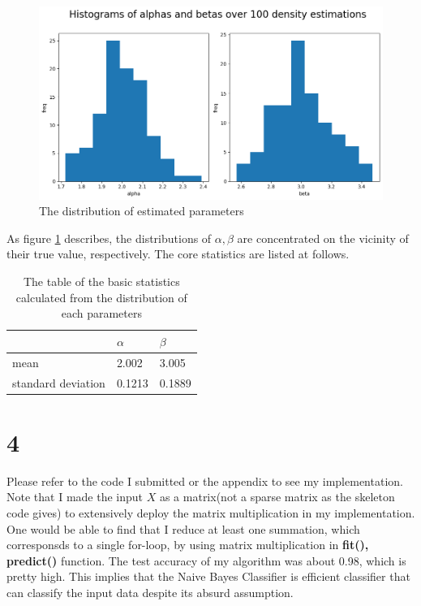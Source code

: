 \documentclass[10pt]{article}
\begin{document}
\begin{figure}[!h]
    \begin{center}
        \includegraphics[scale = 0.5]{"fig/fig2.png"}
    \end{center}
    \caption{The distribution of estimated parameters}
    \label{fig2}
\end{figure}

As figure \ref{fig2} describes, the distributions of $\alpha,\beta$ are concentrated on the vicinity of their true value, respectively. 
The core statistics are listed at follows.
\begin{table}[!h]
    \begin{center}
        \begin{tabular}{lll}
            & $\alpha$ & $\beta$ \\
            \hline \hline
        mean               & 2.002                 & 3.005             \\
        standard deviation & 0.1213                 & 0.1889               
        \end{tabular}
        \caption{The table of the basic statistics calculated from the distribution of each parameters}
    \end{center}
\end{table}

\section*{4}
Please refer to the code I submitted or the appendix to see my implementation.
Note that I made the input $X$ as a matrix(not a sparse matrix as the skeleton code gives) to extensively deploy the matrix multiplication in my implementation.
One would be able to find that I reduce at least one summation, which corresponsds to a single for-loop, by using matrix multiplication in \textbf{fit(), predict()} function.
The test accuracy of my algorithm was about 0.98, which is pretty high. This implies that the Naive Bayes Classifier is efficient classifier that can classify the input data despite its absurd assumption.
\end{document}
